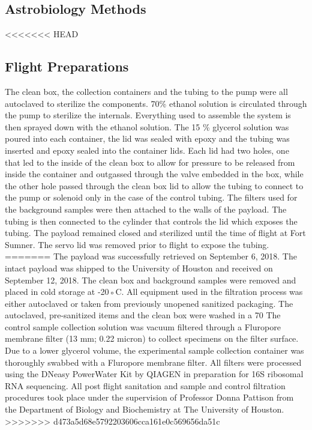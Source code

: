 \subsection{Astrobiology Methods}
\label{sec:Astrobiology Methods}
<<<<<<< HEAD
\subsection{ Flight Preparations }
 The clean box, the collection containers and the tubing to the pump were all autoclaved to sterilize the components. 70\% ethanol solution is circulated through the pump to sterilize the internals. Everything used to assemble the system is then sprayed down with the ethanol solution. The  15 \% glycerol solution was poured into each container, the lid was sealed with epoxy
 and the tubing was inserted and epoxy sealed into the container lids. Each lid had two holes, one that led to the inside of the clean box to allow for pressure to be released from inside the container and outgassed  through the valve embedded in the box, while the other hole passed through the clean box lid to allow the
 tubing to connect to the pump or solenoid only in the case of the control tubing. The filters used for the background samples were then attached to the walls of the payload. The tubing is then connected to the cylinder that controls the lid which exposes the tubing. The payload remained closed and sterilized until the time of flight at Fort Sumner. The servo lid was removed prior to flight to expose the tubing.  
=======
The payload was successfully retrieved on September 6, 2018. The intact payload was shipped to the University of Houston and received on September 12, 2018. The clean box and background samples were removed and placed in cold storage at -20◦C. All equipment used in the filtration process was either autoclaved or taken from previously unopened sanitized packaging. The autoclaved, pre-sanitized items and the clean box were washed in a 70 %
The control sample collection solution was vacuum filtered through a Fluropore membrane filter (13 mm; 0.22 micron) to collect specimens on the filter surface. Due to a lower glycerol volume, the experimental sample collection container was thoroughly swabbed with a Fluropore membrane filter. All filters were processed using the DNeasy PowerWater Kit by QIAGEN in preparation for 16S ribosomal RNA sequencing. All post flight sanitation and sample and control filtration procedures took place under the supervision of Professor Donna Pattison from the Department of Biology and Biochemistry at The University of Houston.
>>>>>>> d473a5d68e5792203606cca161e0c569656da51c
